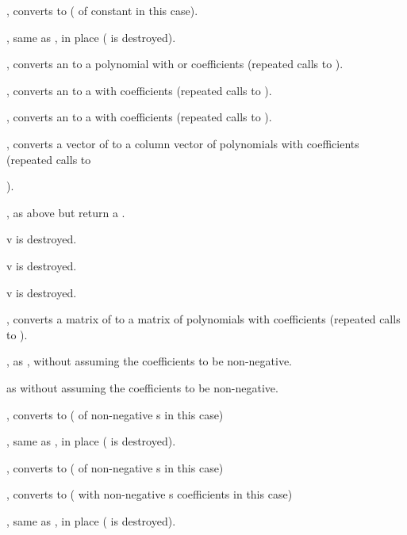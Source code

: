 , converts to  ( of constant
 in this case).

, same as , in place
( is destroyed).

, converts an  to a polynomial with
 or  coefficients (repeated calls to ).

, converts an  to a  with
 coefficients (repeated calls to ).

, converts an  to a  with
 coefficients (repeated calls to ).

, converts a vector of  to a column
vector of polynomials with  coefficients (repeated calls to

).

, as above but return a .

 v is destroyed.

 v is destroyed.

 v is destroyed.

, converts a matrix of  to a matrix of
polynomials with  coefficients (repeated calls to ).

, as , without assuming
the coefficients to be non-negative.

 as  without assuming
the coefficients to be non-negative.

, converts to  ( of non-negative
s in this case)

, same as , in place
( is destroyed).

, converts to  ( of non-negative
s in this case)

, converts to  ( with
non-negative s coefficients in this case)

, same as , in place
( is destroyed).

